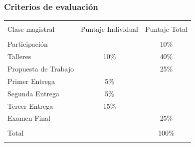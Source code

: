 \documentclass[
  shownotes,
  xcolor={svgnames},
  hyperref={colorlinks,citecolor=DarkBlue,linkcolor=DarkRed,urlcolor=DarkBlue}
  ]{beamer}
\begin{document}
\begin{frame}
\frametitle{Criterios de evaluación}

\begin{table}[H]
\begin{tabular}{lcc}
\hline 
\hline \\
Clase   magistral    & Puntaje Individual & Puntaje Total \\
\hline \\
Participación        &                    & 10\%          \\
Talleres             & 10\%               & 40\%          \\
Propuesta de Trabajo &                    & 25\%          \\
Primer Entrega       & 5\%                &               \\
Segunda Entrega      & 5\%                &               \\
Tercer Entrega       & 15\%               &               \\
Examen Final         &                    & 25\%          \\
\hline \\
Total                &                    & 100\%        \\
\hline 
\hline  \\
\end{tabular}
\end{table}


\end{frame}


\end{document}
